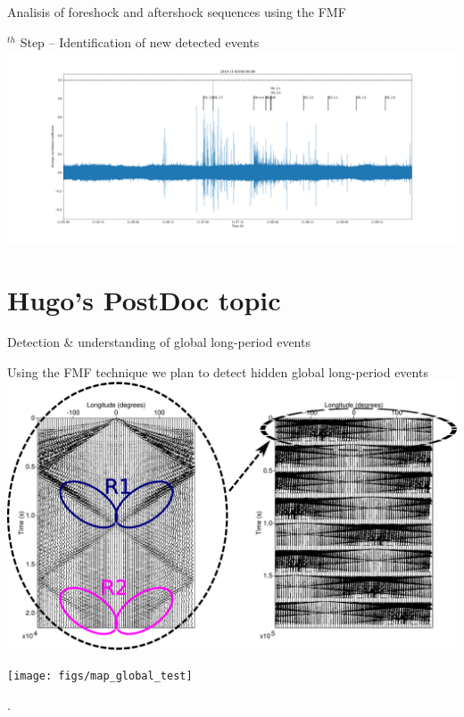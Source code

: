 \documentclass[aspectratio=43,9pt]{beamer}
\begin{document}
\begin{frame}{Analisis of foreshock and aftershock sequences using the FMF}

  \hskip -1.7cm \begin{minipage}{1\linewidth}
    $^{th}$ Step -- Identification of new detected events \\
    \vskip 0.4cm
    \centering \includegraphics[width=1.3\linewidth]{figs/5_correlation_coefficients_with_events}
  \end{minipage}

\end{frame}



\section{Hugo's PostDoc topic}

\begin{frame}{Detection \& understanding of global long-period events}

   \vskip -0.3cm
   \centering Using the FMF technique we plan to detect hidden global long-period events \\
   \vskip 0.3cm
   \includegraphics[width=1\linewidth]{figs/mixed_src_lat0_lon0-360} \\
   \begin{minipage}{0.4\linewidth}
    \vskip -0.9cm \hskip 0.2cm \texttt{[image: figs/map\_global\_test]}   
   \end{minipage}
   \begin{minipage}{0.55\linewidth}
    .
   \end{minipage}


\end{frame}
\end{document}
